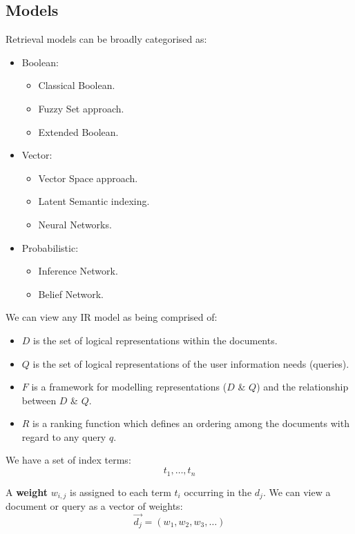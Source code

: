 \documentclass[a4paper,11pt]{article}
\begin{document}
\subsection{Models}
Retrieval models can be broadly categorised as:
\begin{itemize}
    \item   Boolean:
            \begin{itemize}
                \item   Classical Boolean.
                \item   Fuzzy Set approach.
                \item   Extended Boolean.
            \end{itemize}

    \item   Vector:
            \begin{itemize}
                \item   Vector Space approach.
                \item   Latent Semantic indexing.
                \item   Neural Networks.
            \end{itemize}

    \item   Probabilistic:
            \begin{itemize}
                \item   Inference Network.
                \item   Belief Network.
            \end{itemize}
\end{itemize}

We can view any IR model as being comprised of:
\begin{itemize}
    \item   $D$ is the set of logical representations within the documents.
    \item   $Q$ is the set of logical representations of the user information needs (queries).
    \item   $F$ is a framework for modelling representations ($D$ \& $Q$) and the relationship between $D$ \& $Q$.
    \item   $R$ is a ranking function which defines an ordering among the documents with regard to any query $q$.
\end{itemize}

We have a set of index terms:
$$
t_1, \dots , t_n
$$

A \textbf{weight} $w_{i,j}$ is assigned to each term $t_i$ occurring in the $d_j$.
We can view a document or query as a vector of weights:
$$
\vec{d_j} = (w_1, w_2, w_3, \dots)
$$
\end{document}
